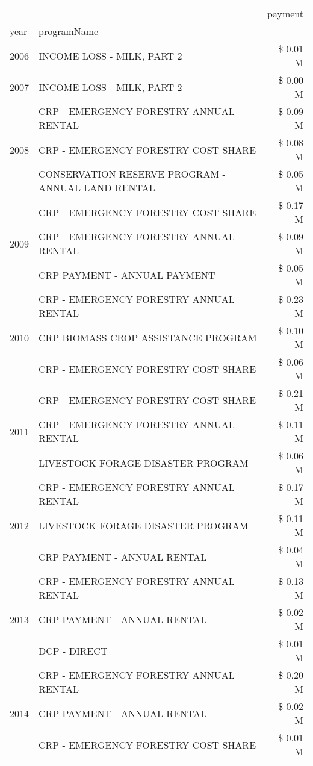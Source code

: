 \begin{tabular}{llr}
\toprule
 &  & payment \\
year & programName &  \\
\midrule
2006 & INCOME LOSS - MILK, PART 2 & \$ 0.01 M \\
\cline{1-3}
2007 & INCOME LOSS - MILK, PART 2 & \$ 0.00 M \\
\cline{1-3}
\multirow[t]{3}{*}{2008} & CRP - EMERGENCY FORESTRY ANNUAL RENTAL & \$ 0.09 M \\
 & CRP - EMERGENCY FORESTRY COST SHARE & \$ 0.08 M \\
 & CONSERVATION RESERVE PROGRAM - ANNUAL LAND RENTAL & \$ 0.05 M \\
\cline{1-3}
\multirow[t]{3}{*}{2009} & CRP - EMERGENCY FORESTRY COST SHARE & \$ 0.17 M \\
 & CRP - EMERGENCY FORESTRY ANNUAL RENTAL & \$ 0.09 M \\
 & CRP PAYMENT - ANNUAL PAYMENT & \$ 0.05 M \\
\cline{1-3}
\multirow[t]{3}{*}{2010} & CRP - EMERGENCY FORESTRY ANNUAL RENTAL & \$ 0.23 M \\
 & CRP BIOMASS CROP ASSISTANCE PROGRAM & \$ 0.10 M \\
 & CRP - EMERGENCY FORESTRY COST SHARE & \$ 0.06 M \\
\cline{1-3}
\multirow[t]{3}{*}{2011} & CRP - EMERGENCY FORESTRY COST SHARE & \$ 0.21 M \\
 & CRP - EMERGENCY FORESTRY ANNUAL RENTAL & \$ 0.11 M \\
 & LIVESTOCK FORAGE DISASTER PROGRAM & \$ 0.06 M \\
\cline{1-3}
\multirow[t]{3}{*}{2012} & CRP - EMERGENCY FORESTRY ANNUAL RENTAL & \$ 0.17 M \\
 & LIVESTOCK FORAGE DISASTER PROGRAM & \$ 0.11 M \\
 & CRP PAYMENT - ANNUAL RENTAL & \$ 0.04 M \\
\cline{1-3}
\multirow[t]{3}{*}{2013} & CRP - EMERGENCY FORESTRY ANNUAL RENTAL & \$ 0.13 M \\
 & CRP PAYMENT - ANNUAL RENTAL & \$ 0.02 M \\
 & DCP - DIRECT & \$ 0.01 M \\
\cline{1-3}
\multirow[t]{3}{*}{2014} & CRP - EMERGENCY FORESTRY ANNUAL RENTAL & \$ 0.20 M \\
 & CRP PAYMENT - ANNUAL RENTAL & \$ 0.02 M \\
 & CRP - EMERGENCY FORESTRY COST SHARE & \$ 0.01 M \\
\cline{1-3}

\end{tabular}
